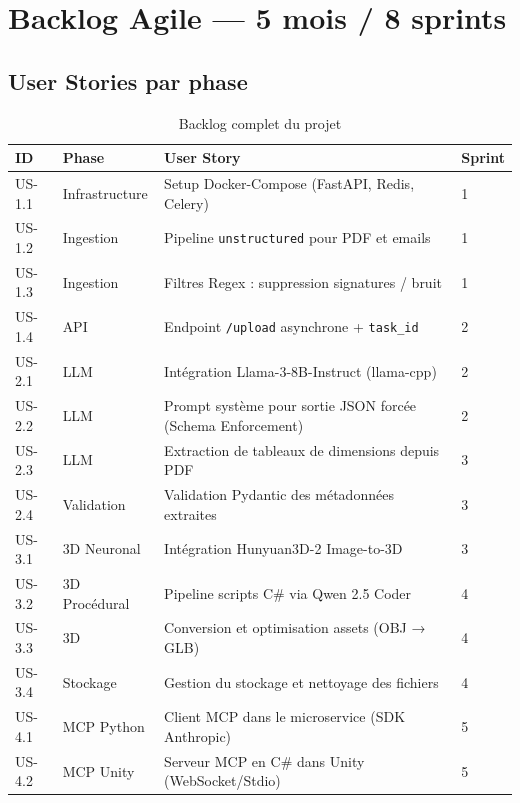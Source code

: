 \documentclass[12pt,a4paper,oneside]{report}
\begin{document}
\section{Backlog Agile — 5 mois / 8 sprints}

\subsection{User Stories par phase}

\begin{table}[H]
\centering
\caption{Backlog complet du projet}
\label{tab:backlog}
\begin{tabularx}{\linewidth}{@{}llXl@{}}
\toprule
\rowcolor{tekupblue!15}
\textbf{ID} & \textbf{Phase} & \textbf{User Story} & \textbf{Sprint} \\
\midrule
\rowcolor{gray!8}
US-1.1 & Infrastructure & Setup Docker-Compose (FastAPI, Redis, Celery) & 1 \\
US-1.2 & Ingestion      & Pipeline \texttt{unstructured} pour PDF et emails & 1 \\
US-1.3 & Ingestion      & Filtres Regex : suppression signatures / bruit & 1 \\
US-1.4 & API            & Endpoint \texttt{/upload} asynchrone + \texttt{task\_id} & 2 \\
\midrule
\rowcolor{tekupblue!8}
US-2.1 & LLM            & Intégration Llama-3-8B-Instruct (llama-cpp) & 2 \\
US-2.2 & LLM            & Prompt système pour sortie JSON forcée (Schema Enforcement) & 2 \\
US-2.3 & LLM            & Extraction de tableaux de dimensions depuis PDF & 3 \\
US-2.4 & Validation     & Validation Pydantic des métadonnées extraites & 3 \\
\midrule
\rowcolor{gray!8}
US-3.1 & 3D Neuronal    & Intégration Hunyuan3D-2 Image-to-3D & 3 \\
US-3.2 & 3D Procédural  & Pipeline scripts C\# via Qwen 2.5 Coder & 4 \\
US-3.3 & 3D             & Conversion et optimisation assets (OBJ → GLB) & 4 \\
US-3.4 & Stockage       & Gestion du stockage et nettoyage des fichiers & 4 \\
\midrule
\rowcolor{tekupblue!8}
US-4.1 & MCP Python     & Client MCP dans le microservice (SDK Anthropic) & 5 \\
US-4.2 & MCP Unity      & Serveur MCP en C\# dans Unity (WebSocket/Stdio) & 5 \\

\end{tabularx}
\end{table}
\end{document}
